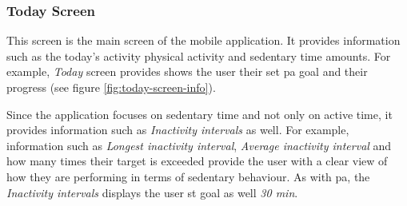     \subsubsection{Today Screen}
    This screen is the main screen of the mobile application. It provides information such as the today's activity physical activity and sedentary time amounts. For example, \textit{Today} screen provides shows the user their set \gls{pa} goal and their progress (see figure \ref{fig:today-screen-info}). 
    
    Since the application focuses on sedentary time and not only on active time, it provides information such as \textit{Inactivity intervals} as well. For example, information such as \textit{Longest inactivity interval}, \textit{Average inactivity interval} and how many times their target is exceeded provide the user with a clear view of how they are performing in terms of sedentary behaviour. As with \gls{pa}, the \textit{Inactivity intervals} displays the user \gls{st} goal as well \textit{30 min}. 

    
    




    
    
    
    